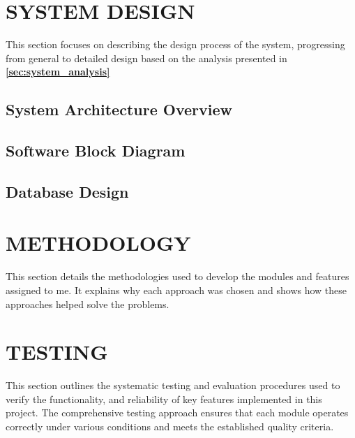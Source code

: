 \documentclass[12pt,a4paper]{article}
\begin{document}
\newpage
\section{SYSTEM DESIGN}\label{sec:system_design}
  \indent

  This section focuses on describing the design process of the system, progressing from general to detailed design based on the analysis presented in \textbf{\autoref{sec:system_analysis} }

  \subsection{System Architecture Overview}
  

  \subsection{Software Block Diagram}
  

  \subsection{Database Design}


\newpage
\section{METHODOLOGY}\label{sec:methodology}
  \indent

  This section details the methodologies used to develop the modules and features assigned to me. It explains why each approach was chosen and shows how these approaches helped solve the problems.
  

\newpage
\section{TESTING}\label{sec:testing}
  \indent

  This section outlines the systematic testing and evaluation procedures used to verify the functionality, and reliability of key features implemented in this project. The comprehensive testing approach ensures that each module operates correctly under various conditions and meets the established quality criteria.
  
\end{document}
